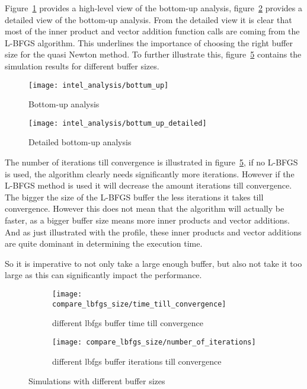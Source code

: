 Figure~\ref{fig:bottom-up analysis} provides a high-level view of the bottom-up analysis, figure~\ref{fig:detailed bottom-up analysis} provides a detailed view of the bottom-up analysis. From the detailed view it is clear that most of the inner product and vector addition function calls are coming from the L-BFGS algorithm. This underlines the importance of choosing the right buffer size for the quasi Newton method. To further illustrate this, figure~\ref{fig:Simulations with different buffer sizes} contains the simulation results for different buffer sizes.

\begin{figure}[H]
	\centering
	\texttt{[image: intel\_analysis/bottum\_up]}
	\caption{Bottom-up analysis}
	\label{fig:bottom-up analysis}
\end{figure}

\begin{figure}[H]
	\centering
	\texttt{[image: intel\_analysis/bottum\_up\_detailed]}
	\caption{Detailed bottom-up analysis}
	\label{fig:detailed bottom-up analysis}
\end{figure}

The number of iterations till convergence is illustrated in figure~\ref{fig:Simulations with different buffer sizes}, if no L-BFGS is used, the algorithm clearly needs significantly more iterations. However if the L-BFGS method is used it will decrease the amount iterations till convergence. The bigger the size of the L-BFGS buffer the less iterations it takes till convergence. However this does not mean that the algorithm will actually be faster, as a bigger buffer size means more inner products and vector additions. And as just illustrated with the profile, these inner products and vector additions are quite dominant in determining the execution time.

So it is imperative to not only take a large enough buffer, but also not take it too large as this can significantly impact the performance.

\begin{figure}[H]
	\centering
	\begin{subfigure}[b]{0.45\textwidth}
		\centering
		\texttt{[image: compare\_lbfgs\_size/time\_till\_convergence]}
		\caption{different lbfgs buffer time till convergence}
		\label{fig:different lbfgs buffer time till convergence}
	\end{subfigure}
	\hfill
	\begin{subfigure}[b]{0.45\textwidth}
		\centering
		\texttt{[image: compare\_lbfgs\_size/number\_of\_iterations]}
		\caption{different lbfgs buffer iterations till convergence}
		\label{fig:different lbfgs buffer iterations till convergence}
	\end{subfigure}
	\caption{Simulations with different buffer sizes}
	\label{fig:Simulations with different buffer sizes}
\end{figure}

